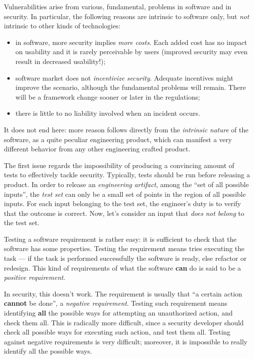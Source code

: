 \documentclass[10pt]{\classname}
\begin{document}
Vulnerabilities arise from various, fundamental, problems in software and in
security. In particular, the following reasons are intrinsic to software only,
but \emph{not} intrinsic to other kinds of technologies:
\begin{itemize}
    \item in software, more security implies \emph{more costs}. Each added cost
        has no impact on usability and it is rarely perceivable by users
        (improved security may even result in decreased usability!);
    \item software market does not \emph{incentivize security}. Adequate
        incentives might improve the scenario, although the fundamental
        problems will remain. There will be a framework change sooner or later
        in the regulations;
    \item there is little to no liability involved when an incident occurs.
\end{itemize}

It does not end here: more reason follows directly from the \emph{intrinsic
nature} of the software, as a quite peculiar engineering product, which can
manifest a very different behavior from any other engineering crafted product.

The first issue regards the impossibility of producing a convincing amount of
tests to effectively tackle security. Typically, tests should be run before releasing a
product. In order to release an \emph{engineering artifact}, among the ``set of
all possible inputs'', the \emph{test set} can only be a small set of points in the
region of all possible inputs. For each input belonging to the test set, the
engineer's duty is to verify that the outcome is correct. Now, let's consider
an input that \emph{does not belong} to the test set.

Testing a software requirement is rather easy: it is sufficient to check that
the software has some properties. Testing the requirement means tries executing
the task --- if the task is performed successfully the software is ready, else
refactor or redesign. This kind of requirements of what the software
\textbf{can} do is said to be a \emph{positive requirement}.

In security, this doesn't work. The requirement is usually that ``a certain
action \textbf{cannot} be done'', a \emph{negative requirement}. Testing such
requirement means identifying \textbf{all} the possible ways for attempting an
unauthorized action, and check them all. This is radically more difficult,
since a security developer should check all possible ways for executing such
action, and test them all. Testing against negative requirements is very
difficult; moreover, it is impossible to really identify all the possible ways.
\end{document}
